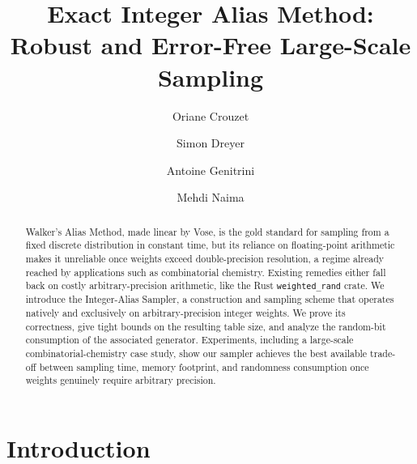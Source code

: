 \documentclass[runningheads]{llncs}
\begin{document}
\title{Exact Integer Alias Method: Robust and Error-Free Large-Scale Sampling}


\author{Oriane Crouzet \and
Simon Dreyer \and
Antoine Genitrini \and
Mehdi Naima}



\maketitle

\begin{abstract}
Walker's Alias Method, made linear by Vose, is the gold standard for sampling from a fixed discrete
distribution in constant time, but its reliance on floating-point arithmetic makes it unreliable once
weights exceed double-precision resolution, a regime already reached by applications such as combinatorial
chemistry. Existing remedies either fall back on costly arbitrary-precision arithmetic, like the Rust
\texttt{weighted\_rand} crate. We introduce the Integer-Alias Sampler, a construction and sampling scheme that
operates natively and exclusively on arbitrary-precision integer weights. We prove its correctness, give tight bounds on the resulting table size, and analyze the random-bit
consumption of the associated generator. Experiments, including a large-scale combinatorial-chemistry case
study, show our sampler achieves the best available trade-off between sampling time, memory footprint, and
randomness consumption once weights genuinely require arbitrary precision.
\end{abstract}



\section{Introduction}
\label{sec:intro}
\end{document}
